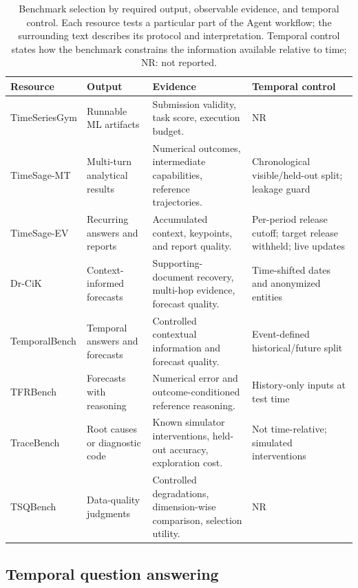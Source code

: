 \documentclass[preprints,article,submit,moreauthors]{Definitions/mdpi}
\begin{document}
\begin{table}[t]
\centering\scriptsize
\setlength{\tabcolsep}{3pt}
\begin{tabularx}{\textwidth}{@{}L{0.16\textwidth}L{0.19\textwidth}XL{0.25\textwidth}@{}}
\toprule
\textbf{Resource} & \textbf{Output} & \textbf{Evidence} & \textbf{Temporal control}\\
\midrule
TimeSeriesGym \citep{timeseriesgym2025} & Runnable ML artifacts & Submission validity, task score, execution budget. & NR\\
TimeSage-MT \citep{timesagemt2026} & Multi-turn analytical results & Numerical outcomes, intermediate capabilities, reference trajectories. & Chronological visible/held-out split; leakage guard\\
TimeSage-EV \citep{timesageev2026} & Recurring answers and reports & Accumulated context, keypoints, and report quality. & Per-period release cutoff; target release withheld; live updates\\
Dr-CiK \citep{drcik2026} & Context-informed forecasts & Supporting-document recovery, multi-hop evidence, forecast quality. & Time-shifted dates and anonymized entities\\
TemporalBench \citep{temporalbench2026} & Temporal answers and forecasts & Controlled contextual information and forecast quality. & Event-defined historical/future split\\
TFRBench \citep{tfrbench2026} & Forecasts with reasoning & Numerical error and outcome-conditioned reference reasoning. & History-only inputs at test time\\
TraceBench \citep{tracebench2026} & Root causes or diagnostic code & Known simulator interventions, held-out accuracy, exploration cost. & Not time-relative; simulated interventions\\
TSQBench \citep{tsqbench2026} & Data-quality judgments & Controlled degradations, dimension-wise comparison, selection utility. & NR\\
\bottomrule
\end{tabularx}
\caption{Benchmark selection by required output, observable evidence, and temporal control. Each resource tests a particular part of the Agent workflow; the surrounding text describes its protocol and interpretation. Temporal control states how the benchmark constrains the information available relative to time; NR: not reported.}
\label{tab:benchmark-families}
\end{table}

\subsection{Temporal question answering}
\label{sec:temporal-qa}
\end{document}
